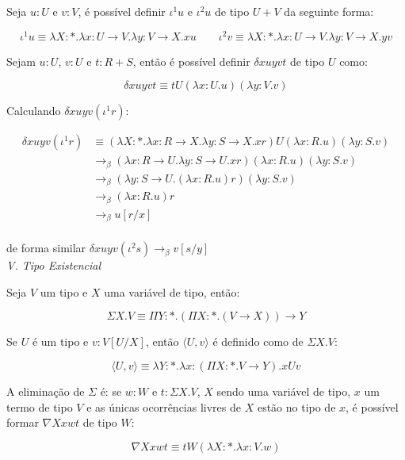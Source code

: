 \documentclass[../main.tex]{subfiles}
\begin{document}
Seja $u : U$ e $v : V$, é possível definir $\iota^1 u$ e $\iota^2 u$ de tipo $U + V$ da seguinte forma:

$$\iota^1 u \equiv \lambda X : \ast . \lambda x : U \to V . \lambda y : V \to X . xu \qquad \iota^2 v \equiv \lambda X : \ast . \lambda x : U \to V . \lambda y : V \to X . yv$$

Sejam $u : U$, $v : U$ e $t : R + S$, então é possível definir $\delta xuyvt$ de tipo $U$ como:

$$\delta xuyvt \equiv tU(\lambda x : U . u)(\lambda y : V . v)$$

Calculando $\delta xuyv (\iota^1 r)$:

\begin{align*}
    \delta xuyv (\iota^1 r) & \equiv (\lambda X : \ast . \lambda x : R \to X . \lambda y : S \to X . xr)U(\lambda x : R . u)(\lambda y : S . v) \\
                            & \to_{\beta} (\lambda x : R \to U . \lambda y : S \to U. xr)(\lambda x : R . u)(\lambda y : S . v) \\
                            & \to_{\beta} (\lambda y : S \to U. (\lambda x : R . u)r)(\lambda y : S . v) \\
                            & \to_{\beta} (\lambda x : R . u)r \\
                            & \to_{\beta} u[r/x] \\
\end{align*}

de forma similar $\delta xuyv (\iota^2 s) \to_{\beta} v[s/y]$\\

\emph{V. Tipo Existencial}

Seja $V$ um tipo e $X$ uma variável de tipo, então:

$$\Sigma X . V \equiv \Pi Y : \ast . (\Pi X : \ast . (V \to X)) \to Y$$

Se $U$ é um tipo e $v : V[U / X]$, então $\langle U, v \rangle$ é definido como de $\Sigma X . V$:

$$\langle U, v \rangle \equiv \lambda Y : \ast . \lambda x : (\Pi X : \ast . V \to Y) . xUv$$

A eliminação de $\Sigma$ é: se $w : W$ e $t : \Sigma X . V$, $X$ sendo uma variável de tipo, $x$ um termo de tipo $V$ e as únicas ocorrências livres  de $X$ estão no tipo de $x$, é possível formar $\nabla X xwt$ de tipo $W$:

$$\nabla X xwt \equiv tW(\lambda X : \ast . \lambda x : V . w)$$
\end{document}

